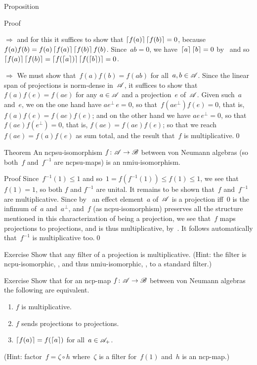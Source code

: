 \documentclass[a]{subfiles}
\begin{document}
\begin{parsec}
\begin{point}[gardner]{Proposition}
\begin{point}{Proof}
\begin{point}{$\Longrightarrow$}
and for this it suffices to show that
$\left\lceil f(a)\right\rceil\left\lceil f(b)\right\rceil=0$,
because $f(a)f(b)=f(a)\left\lceil f(a)\right\rceil\left\lceil f(b)\right\rceil f(b)$.
Since~$ab=0$,
we have~$\left\lceil a\right\rceil\left\lceil b\right\rceil=0$ by~
and so $\left\lceil f(a)\right\rceil\left\lceil f(b)\right\rceil=\left\lceil f(\left\lceil a\right\rceil)\right\rceil\left\lceil f(\left\lceil b\right\rceil)\right\rceil=0$.
\end{point}
\begin{point}{$\Longrightarrow$}%
We must show that~$f(a)f(b)=f(ab)$
for all~$a,b\in \mathscr{A}$.
Since the linear span of projections is norm-dense in~$\mathscr{A}$,
it suffices to show that $f(a)f(e)=f(ae)$
for any $a\in\mathscr{A}$ and a projection~$e$ of~$\mathscr{A}$.
Given such~$a$ and~$e$,
we on the one hand have $ae^\perp\, e=0$,
so that~$f(ae^\perp)f(e)=0$,
that is, $f(a)f(e)=f(ae)f(e)$;
and on the other hand
we have $ae\,e^\perp=0$,
so that~$f(ae)f(e^\perp)=0$,
that is, $f(ae)=f(ae)f(e)$;
so that we reach~$f(ae)=f(a)f(e)$ as sum total,
and the result that~$f$ is multiplicative.\qed
\end{point}
\end{point}
\end{point}
\begin{point}[iso]{Theorem}%
An ncpsu-isomorphism $f\colon \mathscr{A}\to\mathscr{B}$
between von Neumann algebras 
(so both~$f$ and~$f^{-1}$ are ncpsu-maps)
is an nmiu-isomorphism.
\begin{point}{Proof}%
Since~$f^{-1}(1)\leq 1$
and so~$1=f(f^{-1}(1))\leq f(1)\leq 1$,
we see that~$f(1)=1$, so both $f$ and $f^{-1}$ are unital.
It remains to be shown that~$f$ and~$f^{-1}$ are multiplicative.
Since by~ an effect element~$a$ of~$\mathscr{A}$
is a projection iff~$0$ is the infimum of~$a$ and~$a^\perp$,
and~$f$ (as ncpu-isomorphism) preserves all the structure 
mentioned in this characterization of being a projection,
we see that~$f$ maps projections to projections,
and is thus multiplicative, by~.
It follows automatically that~$f^{-1}$ is multiplicative too.\qed
\end{point}
\end{point}
\begin{point}{Exercise}%
Show that any filter of a projection is multiplicative.
(Hint: the filter is
ncpu-isomorphic, ,
and thus nmiu-isomorphic, , to
a standard filter.)
\end{point}
\begin{point}{Exercise}%
Show that for an ncp-map $f\colon \mathscr{A}\to\mathscr{B}$
between von Neumann algebras
the following are equivalent.
\begin{enumerate}
\item
$f$ is multiplicative.
\item
$f$ sends projections to projections.
\item
$\left\lceil f(a)\right\rceil=f(\left\lceil a\right\rceil)$
for all~$a \in\mathscr{A}_+$.
\end{enumerate}
(Hint: factor~$f=\zeta \circ h$
where~$\zeta$ is a filter for~$f(1)$
and~$h$ is an ncp-map.)
\end{point}
\end{parsec}
\end{document}
